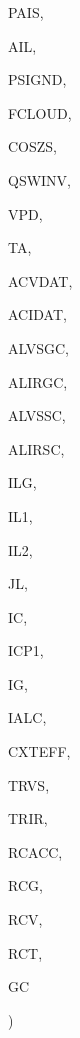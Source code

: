 {\begin{DoxyParamCaption}
\item[{real, dimension  (ilg,ic)}]{P\+A\+I\+S, }
\item[{real, dimension   (ilg,ic)}]{A\+I\+L, }
\item[{real, dimension(ilg)}]{P\+S\+I\+G\+N\+D, }
\item[{real, dimension(ilg)}]{F\+C\+L\+O\+U\+D, }
\item[{real, dimension (ilg)}]{C\+O\+S\+Z\+S, }
\item[{real, dimension(ilg)}]{Q\+S\+W\+I\+N\+V, }
\item[{real, dimension   (ilg)}]{V\+P\+D, }
\item[{real, dimension    (ilg)}]{T\+A, }
\item[{real, dimension(ilg,ic)}]{A\+C\+V\+D\+A\+T, }
\item[{real, dimension(ilg,ic)}]{A\+C\+I\+D\+A\+T, }
\item[{real, dimension(ilg)}]{A\+L\+V\+S\+G\+C, }
\item[{real, dimension(ilg)}]{A\+L\+I\+R\+G\+C, }
\item[{real, dimension(ilg)}]{A\+L\+V\+S\+S\+C, }
\item[{real, dimension(ilg)}]{A\+L\+I\+R\+S\+C, }
\item[{integer}]{I\+L\+G, }
\item[{integer}]{I\+L1, }
\item[{integer}]{I\+L2, }
\item[{integer}]{J\+L, }
\item[{integer}]{I\+C, }
\item[{integer}]{I\+C\+P1, }
\item[{integer}]{I\+G, }
\item[{integer}]{I\+A\+L\+C, }
\item[{real, dimension(ilg,ic)}]{C\+X\+T\+E\+F\+F, }
\item[{real, dimension  (ilg)}]{T\+R\+V\+S, }
\item[{real, dimension  (ilg)}]{T\+R\+I\+R, }
\item[{real, dimension (ilg,ic)}]{R\+C\+A\+C\+C, }
\item[{real, dimension   (ilg,ic)}]{R\+C\+G, }
\item[{real, dimension   (ilg,ic)}]{R\+C\+V, }
\item[{real, dimension   (ilg)}]{R\+C\+T, }
\item[{real, dimension    (ilg)}]{G\+C}
\end{DoxyParamCaption}
)}\label{CANALB_8f_ad01e3318e7b9408fb2f037378ffb6589}

